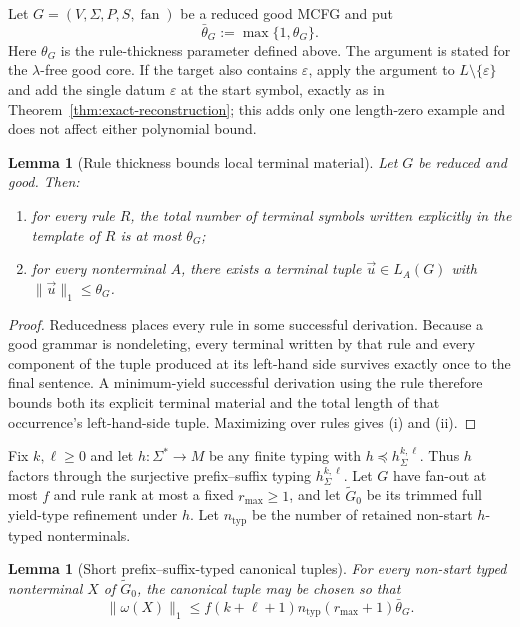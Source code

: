 \documentclass[11pt]{article}
\numberwithin{equation}{section}
\theoremstyle{plain}
\newtheorem{lemma}[theorem]{Lemma}
\theoremstyle{definition}
\theoremstyle{remark}
\newcommand{\tuple}[1]{\vec{#1}}
\newcommand{\eps}{\varepsilon}
\newcommand{\fan}{\operatorname{fan}}
\begin{document}
Let $G=(V,\Sigma,P,S,\fan)$ be a reduced good MCFG and put
\[
  \bar\theta_G:=\max\{1,\theta_G\}.
\]
Here $\theta_G$ is the rule-thickness parameter defined above.  The argument is stated for the
$\lambda$-free good core.  If the target also contains $\eps$, apply
the argument to $L\setminus\{\eps\}$ and add the single datum $\eps$ at
the start symbol, exactly as in Theorem~\ref{thm:exact-reconstruction}; this
adds only one length-zero example and does not affect either polynomial bound.

\begin{lemma}[Rule thickness bounds local terminal material]
\label{lem:thickness-local-bounds}
Let $G$ be reduced and good.  Then:
\begin{enumerate}[label=(\roman*),leftmargin=*]
\item for every rule $R$, the total number of terminal symbols written
explicitly in the template of $R$ is at most $\theta_G$;
\item for every nonterminal $A$, there exists a terminal tuple
$\tuple u\in L_A(G)$ with $\|\tuple u\|_1\le\theta_G$.
\end{enumerate}
\end{lemma}

\begin{proof}
Reducedness places every rule in some successful derivation.  Because a good
grammar is nondeleting, every terminal written by that rule and every component
of the tuple produced at its left-hand side survives exactly once to the final
sentence.  A minimum-yield successful derivation using the rule therefore bounds both
its explicit terminal material and the total length of that occurrence's
left-hand-side tuple.  Maximizing over rules gives (i) and (ii).
\end{proof}

Fix $k,\ell\ge0$ and let
$h:\Sigma^*\to M$ be any finite typing with
$h\preceq h_\Sigma^{k,\ell}$.  Thus $h$ factors through the surjective prefix--suffix typing
$h_\Sigma^{k,\ell}$.  Let $G$ have fan-out at most $f$ and
rule rank at most a fixed $r_{\max}\ge1$, and let $\widetilde G_0$ be its
trimmed full yield-type refinement under $h$.  Let $n_{\mathrm{typ}}$ be the
number of retained non-start $h$-typed nonterminals.

\begin{lemma}[Short prefix--suffix-typed canonical tuples]
\label{lem:boundary-short-canonical}
For every non-start typed nonterminal $X$ of $\widetilde G_0$, the
canonical tuple may be chosen so that
\[
  \|\omega(X)\|_1
  \le f(k+\ell+1)n_{\mathrm{typ}}(r_{\max}+1)\bar\theta_G.
\]
\end{lemma}
\end{document}
